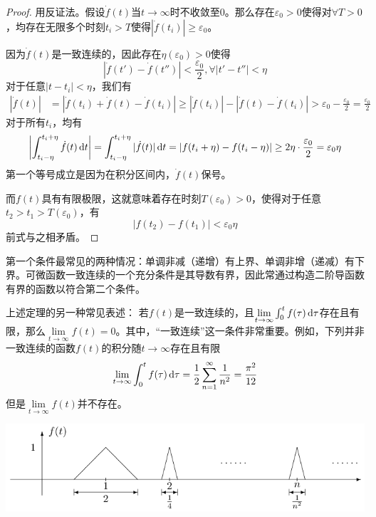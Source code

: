 \begin{proof}
  用反证法。假设$\dot{f}(t)$当$t\to\infty$时不收敛至$0$。那么存在$\varepsilon_0>0$使得对$\forall T>0$，均存在无限多个时刻$t_i>T$使得$|\dot{f}(t_i)|\ge \varepsilon_0$。

  因为$\dot{f}(t)$是一致连续的，因此存在$\eta(\varepsilon_0)>0$使得
  \[|\dot{f}(t')-\dot{f}(t'')|<\frac{\varepsilon_0}{2},\forall |t'-t''|<\eta\]
  对于任意$|t-t_i|<\eta$，我们有
  \begin{align*}
    |\dot{f}(t)|&= |\dot{f}(t_i)+\dot{f}(t)-\dot{f}(t_i)|
    \ge |\dot{f}(t_i)|- |\dot{f}(t)-\dot{f}(t_i)|
    >\varepsilon_0-\frac{\varepsilon_0}{2}=\frac{\varepsilon_0}{2}
  \end{align*}
  对于所有$t_i$，均有
  \[\left|\int_{t_i-\eta}^{t_i+\eta}\dot{f}(t)\mathop{}\!\mathrm{d} t\right|=\int_{t_i-\eta}^{t_i+\eta}|\dot{f}(t)|\mathop{}\!\mathrm{d} t=|f(t_i+\eta)-f(t_i-\eta)|\geq2\eta\cdot\frac{\varepsilon_{0}}{2}=\varepsilon_{0}\eta\]
  第一个等号成立是因为在积分区间内，$\dot{f}(t)$保号。
  
  而$f(t)$具有有限极限，这就意味着存在时刻$T(\varepsilon_0)>0$，使得对于任意$t_2>t_1>T(\varepsilon_0)$，有
 \[|f(t_2)-f(t_1)|<\varepsilon_0\eta\]
  前式与之相矛盾。
\end{proof}
\begin{note}
  第一个条件最常见的两种情况：单调非减（递增）有上界、单调非增（递减）有下界。可微函数一致连续的一个充分条件是其导数有界，因此常通过构造二阶导函数有界的函数以符合第二个条件。

  上述定理的另一种常见表述：
  若$f(t)$是一致连续的，且$\lim\limits_{t\to\infty}\int_{0}^tf(\tau)\mathop{}\!\mathrm{d}\tau$存在且有限，那么$\lim\limits_{t\to\infty}{f}(t)=0$。其中，“一致连续”这一条件非常重要。例如，下列并非一致连续的函数$f(t)$的积分随$t\to\infty$存在且有限
  \[\lim_{t\to\infty}\int_0^tf(\tau)\mathop{}\!\mathrm{d} \tau=\frac{1}{2}\sum_{n=1}^\infty\frac{1}{n^2}=\frac{\pi^2}{12}\]
  但是$\lim\limits_{t\to\infty}f(t)$并不存在。

  \begin{center}
      \includegraphics[scale=0.8]{figure/nonlinear/not_uniform_continuous.png}
      \captionsetup{hypcap=false}
  \end{center}
\end{note}
